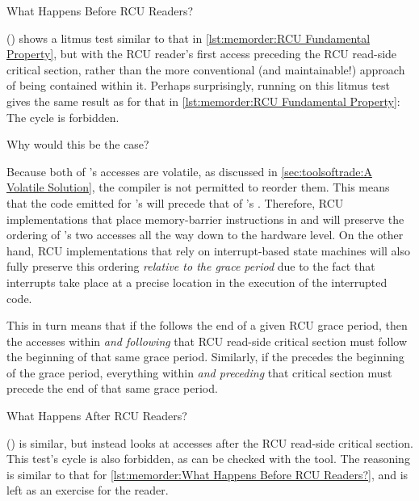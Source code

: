 \begin{listing}

\caption{What Happens Before RCU Readers?}
\label{lst:memorder:What Happens Before RCU Readers?}
\end{listing}

()
shows a litmus test similar to that in
\cref{lst:memorder:RCU Fundamental Property},
but with the RCU reader's first access preceding the RCU read-side critical
section, rather than the more conventional (and maintainable!\@) approach of
being contained within it.
Perhaps surprisingly, running  on this litmus test gives the
same result as for that in
\cref{lst:memorder:RCU Fundamental Property}:
The cycle is forbidden.

Why would this be the case?

Because both of 's accesses are volatile,
as discussed in
\cref{sec:toolsoftrade:A Volatile Solution},
the compiler is not permitted to reorder them.
This means that the code emitted for 's  will
precede that of 's .
Therefore, RCU implementations that place memory-barrier instructions in
 and  will preserve the ordering
of 's two accesses all the way down to the hardware level.
On the other hand, RCU implementations that rely on interrupt-based
state machines will also fully preserve this ordering
\emph{relative to the grace period} due to the fact that interrupts take
place at a precise location in the execution of the interrupted code.

This in turn means that if the  follows the end of a
given RCU grace period, then the accesses within \emph{and following}
that RCU read-side critical section must follow the beginning of that
same grace period.
Similarly, if the  precedes the beginning of the grace
period, everything within \emph{and preceding} that critical section
must precede the end of that same grace period.

\begin{listing}

\caption{What Happens After RCU Readers?}
\label{lst:memorder:What Happens After RCU Readers?}
\end{listing}

()
is similar, but instead looks at accesses after the RCU read-side
critical section.
This test's cycle is also forbidden, as can be checked with the 
tool.
The reasoning is similar to that for
\cref{lst:memorder:What Happens Before RCU Readers?},
and is left as an exercise for the reader.

